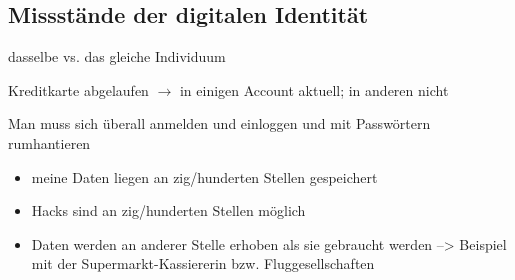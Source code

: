 \vspace{0.3cm}

\vspace{0.5cm}

\subsection{Missstände der digitalen Identität}
\label{sec:einleitung_probleme_digitaler_identitaet}

\vspace{0.3cm}

\begin{Problem}

dasselbe vs. das gleiche Individuum

\end{Problem}

\vspace{0.3cm}


\begin{Problem}

Kreditkarte abgelaufen $\rightarrow$ in einigen Account aktuell; in anderen nicht

\end{Problem}

\vspace{0.3cm}


\begin{Problem}[mangelhafte UX]

Man muss sich überall anmelden und einloggen und mit Passwörtern rumhantieren

\end{Problem}

\vspace{0.3cm}


\begin{Problem}[Datenschutz]

\begin{itemize}
  \item meine Daten liegen an zig/hunderten Stellen gespeichert
  \item Hacks sind an zig/hunderten Stellen möglich
  \item Daten werden an anderer Stelle erhoben als sie gebraucht werden --> Beispiel mit der Supermarkt-Kassiererin bzw. Fluggesellschaften
\end{itemize}

\end{Problem}


